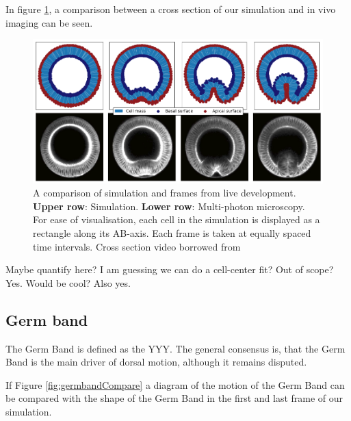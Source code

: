 In figure \ref{fig:VFComparison}, a comparison between a cross section of our simulation and in vivo imaging can be seen.

\begin{figure}[H]
    \centering
    \includegraphics[width=1\linewidth]{chapters/Results/figures/VF_comparison.png}
    \caption{A comparison of simulation and frames from live development. \\\textbf{Upper row}: Simulation. \textbf{Lower row}: Multi-photon microscopy. \\For ease of visualisation, each cell in the simulation is displayed as a rectangle along its AB-axis. Each frame is taken at equally spaced time intervals. Cross section video borrowed from \cite{conte2012biomechanical}}
    \label{fig:VFComparison}
\end{figure}


Maybe quantify here?
I am guessing we can do a cell-center fit?
Out of scope? Yes. Would be cool? Also yes.
\subsection{Germ band}
The Germ Band is defined as the YYY. The general consensus is, that the Germ Band is the main driver of dorsal motion, although it remains disputed.

If Figure \ref{fig:germbandCompare} a diagram of the motion of the Germ Band can be compared with the shape of the Germ Band in the first and last frame of our simulation. 

